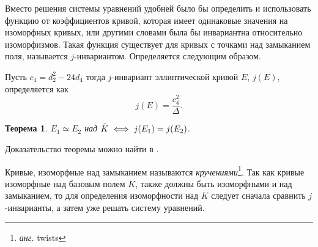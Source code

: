\documentclass[12pt]{article}
\newtheorem{theorem}{Теорема}
\theoremstyle{definition}
\theoremstyle{definition}
\theoremstyle{definition}
\begin{document}
Вместо решения системы уравнений удобней было бы определить и использовать функцию от коэффициентов кривой, которая имеет одинаковые значения на изоморфных кривых, или другими словами была бы инвариантна относительно изоморфизмов. Такая функция существует для кривых с точками над замыканием поля, называется $j$-инвариантом. Определяется следующим образом.

Пусть $c_4 = d_2^2 - 24 d_4$ тогда $j$-инвариант эллиптической кривой $E$, $j(E)$, определяется как 
\[
j(E) = \frac{c_4^2}{\Delta}.
\]

\begin{theorem}
	$E_1 \simeq E_2$ над $\Bar{K} \iff j(E_1)=j(E_2)$.
\end{theorem}
Доказательство теоремы можно найти в \cite[46]{Silverman2009}.
%	
%	
%	
%	
%	

Кривые, изоморфные над замыканием называются \textit{кручениями}\footnote{\textit{анг.} twists}. Так как кривые изоморфные над базовым полем $K$, также должны быть изоморфными и над замыканием, то для определения изоморфности над $K$ следует сначала сравнить $j$-инварианты, а затем уже решать систему уравнений.
\end{document}

